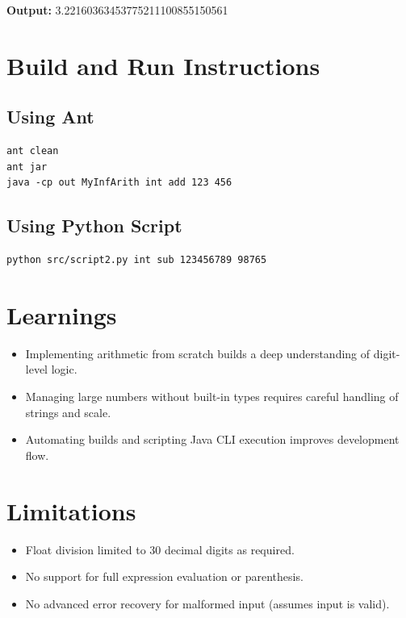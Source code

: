 \documentclass[11pt,a4paper]{article}
\begin{document}
\textbf{Output:} 3.22160363453775211100855150561

\section{Build and Run Instructions}

\subsection{Using Ant}
\begin{verbatim}
ant clean
ant jar
java -cp out MyInfArith int add 123 456
\end{verbatim}

\subsection{Using Python Script}
\begin{verbatim}
python src/script2.py int sub 123456789 98765
\end{verbatim}

\section{Learnings}
\begin{itemize}
    \item Implementing arithmetic from scratch builds a deep understanding of digit-level logic.
    \item Managing large numbers without built-in types requires careful handling of strings and scale.
    \item Automating builds and scripting Java CLI execution improves development flow.
\end{itemize}

\section{Limitations}
\begin{itemize}
    \item Float division limited to 30 decimal digits as required.
    \item No support for full expression evaluation or parenthesis.
    \item No advanced error recovery for malformed input (assumes input is valid).
\end{itemize}
\end{document}
